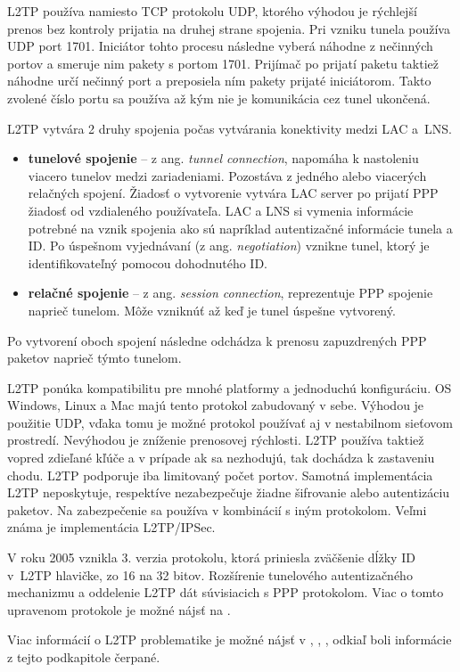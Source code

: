 L2TP používa namiesto TCP protokolu UDP, ktorého výhodou je rýchlejší prenos bez kontroly prijatia na druhej strane spojenia.  
Pri vzniku tunela používa UDP port 1701. Iniciátor tohto procesu následne vyberá náhodne z nečinných portov a smeruje nim pakety s portom 1701. Prijímač po prijatí paketu taktiež náhodne určí nečinný port a preposiela ním pakety prijaté iniciátorom. Takto zvolené číslo portu sa používa až kým nie je komunikácia cez tunel ukončená. 

L2TP vytvára 2 druhy spojenia počas vytvárania konektivity medzi LAC a~LNS. 
\begin{itemize}
	\item{\textbf{tunelové spojenie}} -- z ang. \textit{tunnel connection}, napomáha k nastoleniu viacero tunelov medzi zariadeniami. Pozostáva z jedného alebo viacerých relačných spojení. Žiadosť o vytvorenie vytvára LAC server po prijatí PPP žiadosť od vzdialeného používateľa. LAC a LNS si vymenia informácie potrebné na vznik spojenia ako sú napríklad autentizačné informácie tunela a ID. Po úspešnom vyjednávaní (z ang. \textit{negotiation}) vznikne tunel, ktorý je identifikovateľný pomocou dohodnutého ID.  
	\item{\textbf{relačné spojenie}} -- z ang. \textit{session connection}, reprezentuje PPP spojenie naprieč tunelom. Môže vzniknúť až keď je tunel úspešne vytvorený.	
\end{itemize}     
Po vytvorení oboch spojení následne odchádza k prenosu zapuzdrených PPP paketov naprieč týmto tunelom.

L2TP ponúka kompatibilitu pre mnohé platformy a jednoduchú konfiguráciu. OS Windows, Linux a Mac majú tento protokol zabudovaný v sebe. Výhodou je použitie UDP, vďaka tomu je možné protokol používať aj v nestabilnom sieťovom prostredí.
Nevýhodou je zníženie prenosovej rýchlosti. L2TP používa taktiež vopred zdieľané kľúče a v prípade ak sa nezhodujú, tak dochádza k zastaveniu chodu. L2TP podporuje iba limitovaný počet portov. Samotná implementácia L2TP neposkytuje, respektíve nezabezpečuje žiadne šifrovanie alebo autentizáciu paketov. Na zabezpečenie sa používa v kombinácií s iným protokolom. Veľmi známa je implementácia L2TP/IPSec. 

V roku 2005 vznikla 3. verzia protokolu, ktorá priniesla zväčšenie dĺžky ID v~L2TP hlavičke, zo 16 na 32 bitov. Rozšírenie tunelového autentizačného mechanizmu a oddelenie L2TP dát súvisiacich s PPP protokolom. Viac o tomto upravenom protokole je možné nájsť na \cite{l2tpv3}.
  
Viac informácií o L2TP problematike je možné nájsť v \cite{l2tp}, \cite{rfc2661}, \cite{l2tphuawei}, odkiaľ boli informácie z tejto podkapitole čerpané. 

